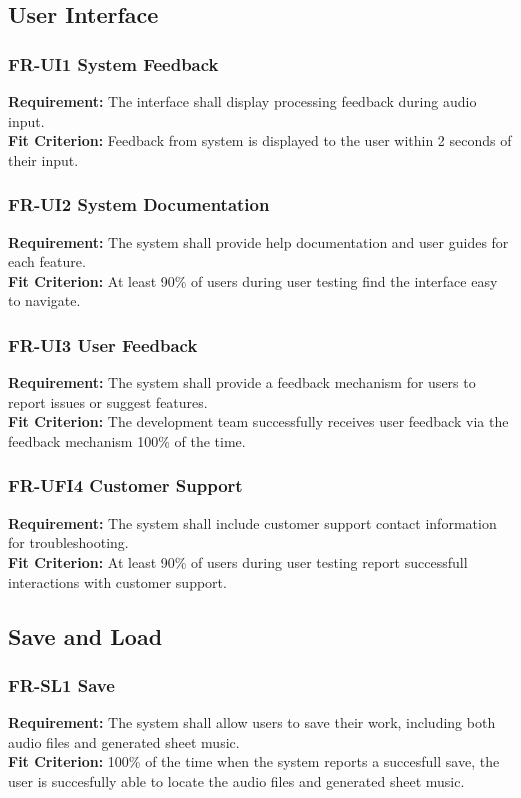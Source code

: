 \documentclass[12pt]{article}
\begin{document}
\subsection{User Interface}
\subsubsection*{FR-UI1 System Feedback}
\textbf{Requirement:} The interface shall display processing feedback during audio input. \\
\textbf{Fit Criterion:} Feedback from system is displayed to the user within 2 seconds of their input.
\subsubsection*{FR-UI2 System Documentation}
\textbf{Requirement:} The system shall provide help documentation and user guides for each feature. \\
\textbf{Fit Criterion:} At least 90\% of users during user testing find the interface easy to navigate.
\subsubsection*{FR-UI3 User Feedback}
\textbf{Requirement:} The system shall provide a feedback mechanism for users to report issues or suggest features. \\
\textbf{Fit Criterion:} The development team successfully receives user feedback via the feedback mechanism 100\% of the time.
\subsubsection*{FR-UFI4 Customer Support}
\textbf{Requirement:} The system shall include customer support contact information for troubleshooting. \\
\textbf{Fit Criterion:} At least 90\% of users during user testing report successfull interactions with customer support.

\subsection{Save and Load}
\subsubsection*{FR-SL1 Save}
\textbf{Requirement:} The system shall allow users to save their work, including both audio files and generated sheet music. \\
\textbf{Fit Criterion:} 100\% of the time when the system reports a succesfull save, the user is succesfully able to locate the audio files and generated sheet music.
\end{document}
